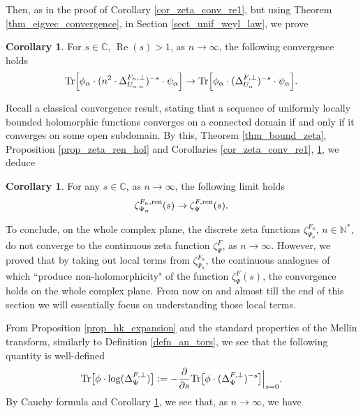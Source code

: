\documentclass[12pt]{article}
\numberwithin{equation}{section}
\theoremstyle{theorem}
\theoremstyle{definition}
\newtheorem{cor}[thm]{Corollary}
\theoremstyle{remark}
\newcommand{\comp}{\mathbb{C}}
\newcommand{\nat}{\mathbb{N}}
\newcommand{\laplcomp}{\Delta}
\newcommand{\tr}[1]{{\rm{Tr}} \big[ #1 \big]}
\renewcommand{\Re}{\operatorname{Re}}
\begin{document}
	Then, as in the proof of Corollary \ref{cor_zeta_conv_re1}, but using Theorem \ref{thm_eigvec_convergence}, in Section \ref{sect_unif_weyl_law}, we prove
	\begin{cor}\label{cor_red_zeta_conv_re1}
		For $s \in \comp$, $\Re(s) > 1$, as $n \to \infty$, the following convergence holds
		\begin{equation}
			{\rm{Tr}} \Big[  \phi_{\alpha} \cdot (n^2 \cdot  \laplcomp_{U_{\alpha, n}}^{F_n, \perp})^{-s} \cdot \psi_{\alpha} \Big] 
			\to 
			{\rm{Tr}} \Big[  \phi_{\alpha} \cdot (\laplcomp_{U_{\alpha}}^{F, \perp})^{-s} \cdot \psi_{\alpha} \Big].
		\end{equation}
	\end{cor}
	Recall a classical convergence result, stating that a sequence of uniformly locally bounded holomorphic functions converges on a connected domain if and only if it converges on some open subdomain.
	By this, Theorem \ref{thm_bound_zeta}, Proposition \ref{prop_zeta_ren_hol}  and  Corollaries \ref{cor_zeta_conv_re1}, \ref{cor_red_zeta_conv_re1},  we deduce
	\begin{cor}\label{cor_conv_zeta_ren}
		For any $s \in \comp$, as $n \to \infty$, the following limit holds
		\begin{equation}
			\zeta^{F_n, {\rm{ren}}}_{\Psi_n}(s) \to \zeta^{F, {\rm{ren}}}_{\Psi}(s).
		\end{equation}
	\end{cor}
	To conclude, on the whole complex plane, the discrete zeta functions $\zeta_{\Psi_n}^{F_n}$, $n \in \nat^*$, do not converge to the continuous zeta function $\zeta_{\Psi}^{F}$, as $n \to \infty$. However, we proved that by taking out local terms from $\zeta_{\Psi_n}^{F_n}$, the continuous analogues of which “produce non-holomorphicity" of the function $\zeta_{\Psi}^{F}(s)$, the convergence holds on the whole complex plane.
	From now on and almost till the end of this section we will essentially focus on understanding those local terms.
	\par From Proposition \ref{prop_hk_expansion} and the standard properties of the Mellin transform, similarly to Definition \ref{defn_an_tors}, we see that the following quantity is well-defined
	\begin{equation}
		\tr{\phi \cdot \log(\laplcomp_{\Psi}^{F, \perp})} := -\frac{\partial}{\partial s} \tr{\phi \cdot (\laplcomp_{\Psi}^{F, \perp})^{-s}} \Big|_{s = 0}.
	\end{equation}
	By Cauchy formula and Corollary \ref{cor_conv_zeta_ren}, we see that, as $n \to \infty$, we have
\end{document}
